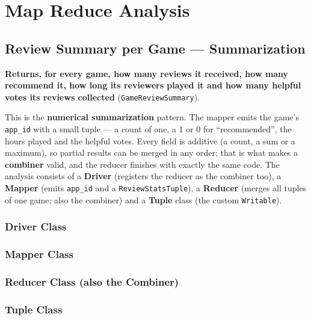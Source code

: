 \documentclass[11pt,a4paper]{article}
\newcommand{\java}[2]{}
\newcommand{\code}[1]{\texttt{#1}}
\begin{document}
\newpage
\section{Map Reduce Analysis}

\subsection{Review Summary per Game — Summarization}
\textbf{Returns, for every game, how many reviews it received, how many recommend it, how long its
reviewers played it and how many helpful votes its reviews collected} (\code{GameReviewSummary}).

This is the \textbf{numerical summarization} pattern. The mapper emits the game's \code{app\_id} with a
small tuple — a count of one, a 1 or 0 for ``recommended'', the hours played and the helpful votes.
Every field is additive (a count, a sum or a maximum), so partial results can be merged in any order;
that is what makes a \textbf{combiner} valid, and the reducer finishes with exactly the same code.
The analysis consists of a \textbf{Driver} (registers the reducer as the combiner too), a
\textbf{Mapper} (emits \code{app\_id} and a \code{ReviewStatsTuple}), a \textbf{Reducer} (merges all
tuples of one game; also the combiner) and a \textbf{Tuple} class (the custom \code{Writable}).

\begin{multicols}{2}
\subsubsection*{Driver Class}
\java{../GameReviewSummary/src/main/java/steam/summary/GameReviewSummary.java}{1-1,10-41}
\subsubsection*{Mapper Class}
\java{../GameReviewSummary/src/main/java/steam/summary/ReviewMapper.java}{1-1,9-37}
\subsubsection*{Reducer Class (also the Combiner)}
\java{../GameReviewSummary/src/main/java/steam/summary/ReviewReducer.java}{1-1,8-26}
\subsubsection*{Tuple Class}
\java{../GameReviewSummary/src/main/java/steam/summary/ReviewStatsTuple.java}{1-1,9-67}
\end{multicols}
\end{document}
